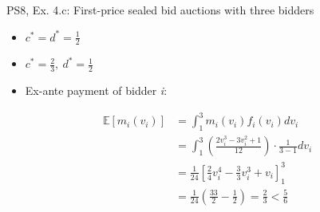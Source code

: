 \begin{frame}{PS8, Ex. 4.c: First-price sealed bid auctions with three bidders}
\begin{multicols}{2}
\begin{itemize}
        \item[(3.a)] $c^*=d^*=\frac{1}{2}$
        \item[(4.a)] $c^*=\frac{2}{3},\ d^*=\frac{1}{2}$
        \item[\nth{2}:] Ex-ante payment of bidder \textit{i}:
      \end{itemize}
      \vspace{-12pt}
      \begin{align*}
        \mathbb{E}[m_i(v_i)]&=\textstyle\int_1^3m_i(v_i)f_i(v_i)dv_i\\
                            &=\textstyle\int_1^3\left(\frac{2v_i^3-3v_i^2+1}{12}\right)\cdot\frac{1}{3-1}dv_i\\
                            &=\frac{1}{24}\left[\frac{2}{4}v_i^4-\frac{3}{3}v_i^3+v_i\right]_1^3\\
                            &=\frac{1}{24}\left(\frac{33}{2}-\frac{1}{2}\right)=\frac{2}{3}<\frac{5}{6}
      \end{align*}
      \vfill\null
    \end{multicols}
    \vfill\null
\end{frame}
